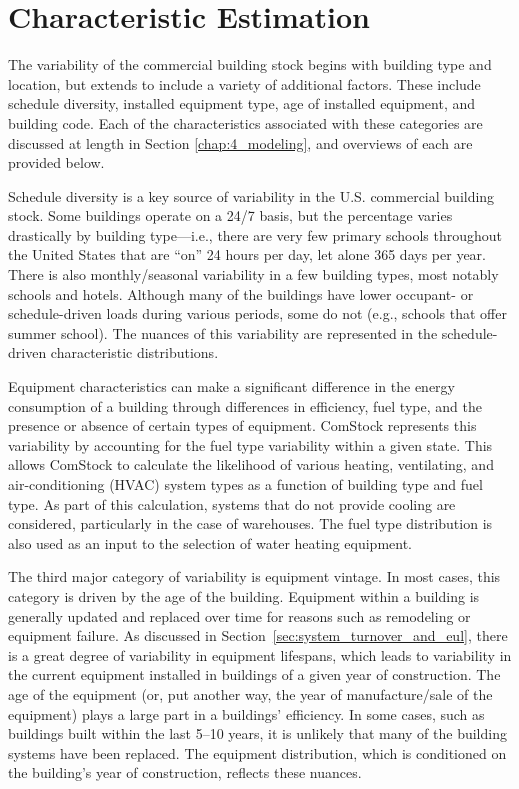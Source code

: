 \section{Characteristic Estimation} \label{Characteristic Estimation}

The variability of the commercial building stock begins with building type and location, but extends to include a variety of additional factors. These include schedule diversity, installed equipment type, age of installed equipment, and building code. Each of the characteristics associated with these categories are discussed at length in Section \ref{chap:4_modeling}, and overviews of each are provided below.

Schedule diversity is a key source of variability in the U.S. commercial building stock. Some buildings operate on a 24/7 basis, but the percentage varies drastically by building type---i.e., there are very few primary schools throughout the United States that are ``on'' 24 hours per day, let alone 365 days per year. There is also monthly/seasonal variability in a few building types, most notably schools and hotels. Although many of the buildings have lower occupant- or schedule-driven loads during various periods, some do not (e.g., schools that offer summer school). The nuances of this variability are represented in the schedule-driven characteristic distributions.

Equipment characteristics can make a significant difference in the energy consumption of a building through differences in efficiency, fuel type, and the presence or absence of certain types of equipment. ComStock represents this variability by accounting for the fuel type variability within a given state. This allows ComStock to calculate the likelihood of various heating, ventilating, and air-conditioning (HVAC) system types as a function of building type and fuel type. As part of this calculation, systems that do not provide cooling are considered, particularly in the case of warehouses. The fuel type distribution is also used as an input to the selection of water heating equipment.

The third major category of variability is equipment vintage. In most cases, this category is driven by the age of the building. Equipment within a building is generally updated and replaced over time for reasons such as remodeling or equipment failure. As discussed in Section~\ref{sec:system_turnover_and_eul}, there is a great degree of variability in equipment lifespans, which leads to variability in the current equipment installed in buildings of a given year of construction. The age of the equipment (or, put another way, the year of manufacture/sale of the equipment) plays a large part in a buildings' efficiency. In some cases, such as buildings built within the last 5--10 years, it is unlikely that many of the building systems have been replaced. The equipment distribution, which is conditioned on the building's year of construction, reflects these nuances.

